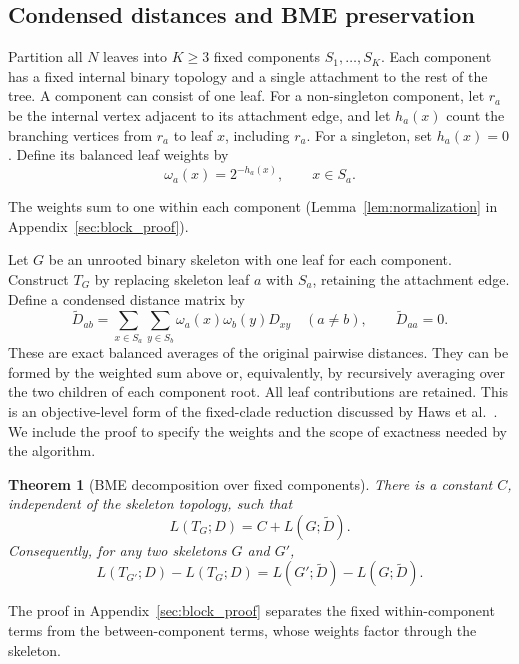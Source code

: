 \documentclass[11pt,a4paper]{article}
\makeatletter
\DeclareRobustCommand{\_}{\ifmmode\nfss@text{\textunderscore}\else\textunderscore\allowbreak\fi}
\newtheorem{theorem}{Theorem}[section]
\theoremstyle{definition}
\makeatother
\begin{document}
\subsection{Condensed distances and BME preservation}
\label{sec:condensation}

Partition all $N$ leaves into $K\geq3$ fixed components $S_1,\ldots,S_K$.
Each component has a fixed internal binary topology and a single attachment to the rest of the tree.
A component can consist of one leaf.
For a non-singleton component, let $r_a$ be the internal vertex adjacent to its attachment edge, and let $h_a(x)$ count the branching vertices from $r_a$ to leaf $x$, including $r_a$.
For a singleton, set $h_a(x)=0$.
Define its balanced leaf weights by
\begin{equation}
 \omega_a(x)=2^{-h_a(x)},\qquad x\in S_a.
 \label{eq:profile}
\end{equation}

The weights sum to one within each component (Lemma~\ref{lem:normalization} in Appendix~\ref{sec:block_proof}).

Let $G$ be an unrooted binary skeleton with one leaf for each component.
Construct $T_G$ by replacing skeleton leaf $a$ with $S_a$, retaining the attachment edge.
Define a condensed distance matrix by
\begin{equation}
 \widetilde D_{ab}
 =\sum_{x\in S_a}\sum_{y\in S_b}
    \omega_a(x)\omega_b(y)D_{xy}\quad(a\ne b),
 \qquad \widetilde D_{aa}=0.
 \label{eq:condensed_D}
\end{equation}
These are exact balanced averages of the original pairwise distances.
They can be formed by the weighted sum above or, equivalently, by recursively averaging over the two children of each component root.
All leaf contributions are retained.
This is an objective-level form of the fixed-clade reduction discussed by Haws et al.~\cite[Section~2.4]{haws2011optimality}.
We include the proof to specify the weights and the scope of exactness needed by the algorithm.

\begin{theorem}[BME decomposition over fixed components]
\label{thm:clade_condense}
There is a constant $C$, independent of the skeleton topology, such that
\begin{equation}
 L(T_G;D)=C+L(G;\widetilde D).
 \label{eq:bme_condense_decomp}
\end{equation}
Consequently, for any two skeletons $G$ and $G'$,
\begin{equation}
 L(T_{G'};D)-L(T_G;D)
 =L(G';\widetilde D)-L(G;\widetilde D).
 \label{eq:condensed_delta}
\end{equation}
\end{theorem}
The proof in Appendix~\ref{sec:block_proof} separates the fixed within-component terms from the between-component terms, whose weights factor through the skeleton.
\end{document}
